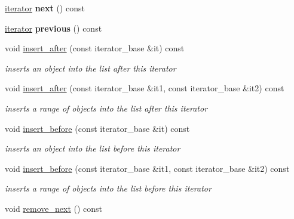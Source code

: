 \begin{DoxyCompactItemize}
\item 
\hypertarget{structIntrusiveList_1_1reverse__iterator_afde419e9842d0ec0ce1172f54b2e7853}{}\hyperlink{structIntrusiveList_1_1iterator}{iterator} {\bfseries next} () const \label{structIntrusiveList_1_1reverse__iterator_afde419e9842d0ec0ce1172f54b2e7853}

\item 
\hypertarget{structIntrusiveList_1_1reverse__iterator_a4dd724b30f1c6e41da5d99a0d7e31aeb}{}\hyperlink{structIntrusiveList_1_1iterator}{iterator} {\bfseries previous} () const \label{structIntrusiveList_1_1reverse__iterator_a4dd724b30f1c6e41da5d99a0d7e31aeb}

\item 
void \hyperlink{structIntrusiveList_1_1reverse__iterator_abfda2bc32c61407c4042cb1fca3f51b4}{insert\+\_\+after} (const iterator\+\_\+base \&it) const 
\begin{DoxyCompactList}\small\item\em inserts an object into the list after this iterator \end{DoxyCompactList}\item 
void \hyperlink{structIntrusiveList_1_1reverse__iterator_a201115d4c392417036b0b59812eea02e}{insert\+\_\+after} (const iterator\+\_\+base \&it1, const iterator\+\_\+base \&it2) const 
\begin{DoxyCompactList}\small\item\em inserts a range of objects into the list after this iterator \end{DoxyCompactList}\item 
void \hyperlink{structIntrusiveList_1_1reverse__iterator_a86e8f8fba96b1aee6cc59f05a0a65bea}{insert\+\_\+before} (const iterator\+\_\+base \&it) const 
\begin{DoxyCompactList}\small\item\em inserts an object into the list before this iterator \end{DoxyCompactList}\item 
void \hyperlink{structIntrusiveList_1_1reverse__iterator_a0106c20bec632ac538e83cf9559dc9f1}{insert\+\_\+before} (const iterator\+\_\+base \&it1, const iterator\+\_\+base \&it2) const 
\begin{DoxyCompactList}\small\item\em inserts a range of objects into the list before this iterator \end{DoxyCompactList}\item 
\hypertarget{structIntrusiveList_1_1reverse__iterator_aa4675ad15d5368578bb068fddb4de6e4}{}void \hyperlink{structIntrusiveList_1_1reverse__iterator_aa4675ad15d5368578bb068fddb4de6e4}{remove\+\_\+next} () const \label{structIntrusiveList_1_1reverse__iterator_aa4675ad15d5368578bb068fddb4de6e4}


\end{DoxyCompactItemize}
